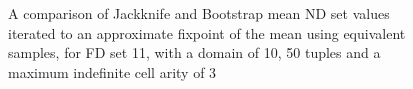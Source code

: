 \begin{figure}
\begin{minipage}{7cm}
\centerline{}
\end{minipage}
\hfill
\begin{minipage}{7cm}
\centerline{}
\end{minipage}
\caption{\label{graph:7.1} {A comparison of Jackknife and
Bootstrap mean ND set values iterated to an approximate fixpoint of
the mean using equivalent samples, for FD set 11, with a domain of 10,
50 tuples and a maximum indefinite cell arity of 3}}
\end{figure}


